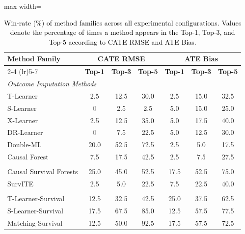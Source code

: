 \documentclass{article} %
\newcommand{\rebuttal}[1]{\textcolor{black}{#1}}
\begin{document}
\begin{table}[t]
\centering \small
\caption{\rebuttal{Win-rate (\%) of method families across all experimental configurations. 
\textcolor{black}{Values denote the percentage of times a method appears in the Top-1, Top-3, and Top-5 
according to CATE RMSE and ATE Bias.}}}
\label{tab:overall-winrate}
\begin{adjustbox}{max width=\textwidth}
\begin{tabular}{lccc@{\hspace{18pt}}ccc}
\toprule
\multirow{2}{*}{\textbf{Method Family}} &
\multicolumn{3}{c}{\textbf{CATE RMSE}} &
\multicolumn{3}{c}{\textbf{ATE Bias}} \\
\cmidrule(lr){2-4} \cmidrule(lr){5-7}
& \textbf{Top-1} & \textbf{Top-3} & \textbf{Top-5}
& \textbf{Top-1} & \textbf{Top-3} & \textbf{Top-5} \\
\midrule
\multicolumn{7}{l}{\textit{Outcome Imputation Methods}} \\
T-Learner               & 2.5  & 12.5 & 30.0 & 2.5 & 15.0 & 32.5 \\
S-Learner               & \textcolor{gray}{0} & 2.5  & 2.5  & 5.0 & 15.0 & 25.0 \\
X-Learner               & 2.5  & 12.5 & 35.0 & 5.0 & 17.5 & 40.0 \\
DR-Learner              & \textcolor{gray}{0} & 7.5  & 22.5 & 5.0 & 12.5 & 30.0 \\
Double-ML               & 20.0 & 52.5 & 72.5 & 2.5 & 5.0  & 17.5 \\
Causal Forest           & 7.5  & 17.5 & 42.5 & 2.5 & 7.5  & 27.5 \\
\addlinespace %
\multicolumn{7}{l}{\textit{Direct-Survival CATE Methods}}\\
Causal Survival Forests  & 25.0 & 45.0 & 52.5 & 17.5 & 52.5 & 75.0 \\
SurvITE                 & 2.5  & 5.0  & 22.5 & 7.5  & 22.5 & 40.0 \\
\addlinespace %
\multicolumn{7}{l}{\textit{Survival Meta-Learners}} \\
T-Learner-Survival      & 12.5 & 32.5 & 42.5 & 25.0 & 37.5 & 62.5 \\
S-Learner-Survival      & 17.5 & 67.5 & 85.0 & 12.5 & 57.5 & 77.5 \\
Matching-Survival       & 12.5 & 50.0 & 92.5 & 17.5 & 57.5 & 72.5 \\
\bottomrule
\end{tabular}
\end{adjustbox}
\end{table}
\end{document}
